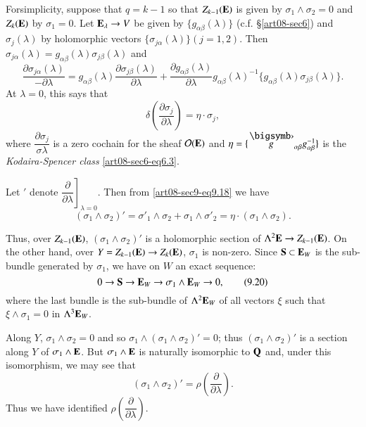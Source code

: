For\pageoriginale simplicity, suppose that $q=k-1$ so that $Z_{k-1}(\mathbf{E})$ is given by $\sigma_{1}\wedge\sigma_{2}=0$ and $Z_{k}(\mathbf{E})$ by $\sigma_{1}=0$. Let $\mathbf{E}_{\lambda}\to V$ be given by $\{g_{\alpha\beta}(\lambda)\}$ (c.f. \S\ref{art08-sec6}) and $\sigma_{j}(\lambda)$ by holomorphic vectors $\{\sigma_{j\alpha}(\lambda)\}(j=1,2)$. Then $\sigma_{j\alpha}(\lambda)=g_{\alpha\beta}(\lambda)\sigma_{j\beta}(\lambda)$ and
$$
\dfrac{\partial\sigma_{j\alpha}(\lambda)}{-\partial\lambda}=g_{\alpha\beta}(\lambda)\dfrac{\partial\sigma_{j\beta}(\lambda)}{\partial \lambda}+\dfrac{\partial g_{\alpha\beta}(\lambda)}{\partial \lambda}g_{\alpha\beta}(\lambda)^{-1}\{g_{\alpha\beta}(\lambda)\sigma_{j\beta}(\lambda)\}.
$$
At $\lambda=0$, this says that
\begin{equation*}
\delta\left(\dfrac{\partial \sigma_{j}}{\partial\lambda}\right)=\eta\cdot \sigma_{j},\tag{9.18}\label{art08-sec9-eq9.18}
\end{equation*}
where $\dfrac{\partial\sigma_{j}}{\sigma\lambda}$ is a zero cochain for the sheaf $\mathcal{O}(\mathbf{E})$ and $\eta=\{\overdot{g}_{\alpha\beta}g^{-1}_{\alpha\beta}\}$ is the {\em Kodaira-Spencer class} \eqref{art08-sec6-eq6.3}.

Let $'$ denote $\left.\dfrac{\partial}{\partial \lambda}\right]_{\lambda=0}$. Then from \eqref{art08-sec9-eq9.18} we have
\begin{equation*}
(\sigma_{1}\wedge \sigma_{2})'=\sigma'_{1}\wedge \sigma_{2}+\sigma_{1}\wedge \sigma'_{2}=\eta\cdot (\sigma_{1}\wedge \sigma_{2}).\tag{9.19}\label{art08-sec9-eq9.19}
\end{equation*}

Thus, over $Z_{k-1}(\mathbf{E})$, $(\sigma_{1}\wedge \sigma_{2})'$ is a holomorphic section of $\Lambda^{2}\mathbf{E}\to Z_{k-1}(\mathbf{E})$. On the other hand, over $Y=Z_{k-1}(\mathbf{E})\to Z_{k}(\mathbf{E})$, $\sigma_{1}$ is non-zero. Since $\mathbf{S}\subset \mathbf{E}_{W}$ is the sub-bundle generated by $\sigma_{1}$, we have on $W$ an exact sequence:
\begin{equation*}
0\to \mathbf{S}\to \mathbf{E}_{W}\to \sigma_{1}\wedge \mathbf{E}_{W}\to 0,\tag{9.20}\label{art08-sec9-eq9.20}
\end{equation*}
where the last bundle is the sub-bundle of $\Lambda^{2}\mathbf{E}_{W}$ of all vectors $\xi$ such that $\xi\wedge\sigma_{1}=0$ in $\Lambda^{3}\mathbf{E}_{W}$.

Along $Y$, $\sigma_{1}\wedge\sigma_{2}=0$ and so $\sigma_{1}\wedge (\sigma_{1}\wedge\sigma_{2})'=0$; thus $(\sigma_{1}\wedge\sigma_{2})'$ is a section along $Y$ of $\sigma_{1}\wedge\mathbf{E}$. But $\sigma_{1}\wedge\mathbf{E}$ is naturally isomorphic to $\mathbf{Q}$ and, under this isomorphism, we may see that
\begin{equation*}
(\sigma_{1}\wedge\sigma_{2})'=\rho\left(\dfrac{\partial}{\partial\lambda}\right).\tag{9.21}\label{art08-sec9-eq9.21}
\end{equation*}
Thus we have identified $\rho\left(\dfrac{\partial}{\partial\lambda}\right)$.

